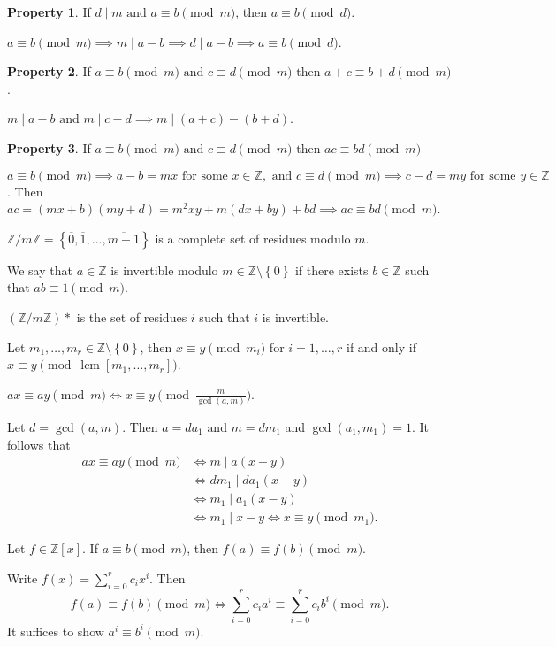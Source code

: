 \documentclass[11pt]{article}
\theoremstyle{definition}
\newtheorem{pty}{Property}[section]
\newcommand{\The}[2]{\begin{#1}#2\end{#1}}
\newcommand{\sm}[0]{\setminus}
\newcommand{\set}[1]{\left\{ #1 \right\}}
\newcommand{\rng}[2]{#1,\dots,#2}
\newcommand{\srng}[3]{#1_#2,\dots,#1_#3}
\newcommand{\et}[0]{\text{ and }}
\newcommand{\then}[0]{\text{ then }}
\newcommand{\forsome}[0]{\text{ for some }}
\DeclareMathOperator{\lcm}{lcm}
\newcommand{\ZZ}{\mathbb{Z}}
\begin{document}
\begin{pty} If $d\mid m \et a\equiv b\pmod{m}$, then $a\equiv b\pmod{d}$. \end{pty}
\proof $a\equiv b\pmod{m} \implies m\mid a-b \implies d\mid a-b \implies a\equiv b\pmod{d}$.

\begin{pty} If $a\equiv b\pmod{m} \et c\equiv d\pmod{m} \then a+c\equiv b+d\pmod{m}$. \end{pty}
\proof $m\mid a-b \et m\mid c-d \implies m\mid (a+c)-(b+d)$. \qedhere

\begin{pty} If $a\equiv b\pmod{m} \et c\equiv d\pmod{m} \then ac\equiv bd\pmod{m}$ \end{pty}
\proof $a\equiv b\pmod{m} \implies a-b=mx \forsome x\in\ZZ, \et c\equiv d\pmod{m} \implies c-d=my \forsome y\in\ZZ$. Then $ac = (mx+b)(my+d) = m^2xy + m(dx+by) + bd \implies ac\equiv bd\pmod{m}$. 
\qedhere

\The{defn}{ $\ZZ/m\ZZ = \set{\overline{0}, \overline{1}, ..., \overline{m-1}}$ is a complete set of residues modulo $m$. 
}

\The{defn}{	We say that $a\in\ZZ$ is invertible modulo $m\in\ZZ\sm\set{0}$ if there exists $b\in\ZZ$ such that $ab \equiv 1 \pmod{m}$.
}

\The{defn}{ $(\ZZ/m\ZZ)*$ is the set of residues $\overline{i}$ such that $\overline{i}$ is invertible.
}

\The{prop}{ Let $\srng{m}{1}{r}\in\ZZ\sm\set{0}$, then $x\equiv y \pmod{m_i}$ for $i=\rng{1}{r}$ if and only if $x\equiv y\pmod{\lcm[\srng{m}{1}{r}]}$. 
}

\The{prop}{ $ax\equiv ay\pmod{m} \iff x\equiv y\pmod{\frac{m}{\gcd(a,m)}}$.
} \proof Let $d=\gcd(a,m)$. Then $a=da_1 \et m=dm_1$ and $\gcd(a_1,m_1)=1$. It follows that 
\The{align*}{
	ax\equiv ay \pmod{m} &\iff m\mid a(x-y) \\
	&\iff dm_1\mid da_1(x-y) \\
	&\iff m_1\mid a_1(x-y) \\
	&\iff m_1\mid x-y \iff x\equiv y\pmod{m_1}.
}

\The{prop}{ Let $f\in\ZZ[x]$. If $a\equiv b\pmod{m}$, then $f(a)\equiv f(b)\pmod{m}$. 
} \proof Write $f(x) = \sum_{i=0}^{r} {c_i x^i}$. Then 
$$ f(a)\equiv f(b) \pmod{m} \iff \sum_{i=0}^{r}c_ia^i \equiv \sum_{i=0}^{r}c_ib^i \pmod{m}. $$
It suffices to show $a^i \equiv b^i \pmod{m}$.
\end{document}
